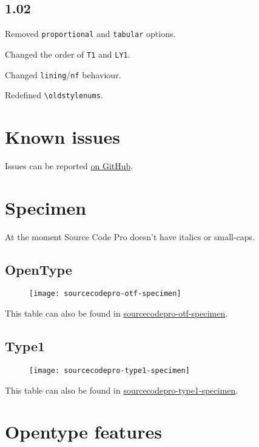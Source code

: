 \documentclass[10pt,a4paper,english]{article}
\newcommand*\file[1]{\href{run:#1.pdf}{#1}}
\begin{document}
\begin{multicols}{2}
\subsection*{1.02}
\begin{itemize*}
	\item Removed \texttt{proportional} and \texttt{tabular} options.
	\item Changed the order of \texttt{T1} and \texttt{LY1}.
	\item Changed \texttt{lining}/\texttt{nf} behaviour.
	\item Redefined \texttt{\textbackslash oldstylenums}.
\end{itemize*}

\section{Known issues}
Issues can be reported \href{https://github.com/silkeh/latex-sourcecodepro/issues}{on GitHub}.


\newpage
\end{multicols}

\section{Specimen}
At the moment Source Code Pro doesn’t have italics or small-caps.
\label{sec:specimen}
\subsection{OpenType}
\begin{figure}[ht]
	\centering
	\texttt{[image: sourcecodepro-otf-specimen]}
\end{figure}
This table can also be found in \file{sourcecodepro-otf-specimen}.

\subsection{Type1}
\begin{figure}[ht]
	\centering
	\texttt{[image: sourcecodepro-type1-specimen]}
\end{figure}
This table can also be found in \file{sourcecodepro-type1-specimen}.

\newpage
\section{Opentype features}
\label{sec:otfinfo}
\end{document}

